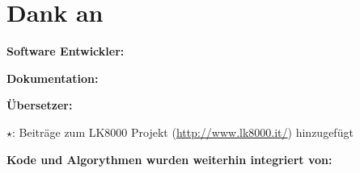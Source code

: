 \section{Dank an}\label{sec:credits}

{\large\bf Software Entwickler:}
\begin{compactitem}

\end{compactitem}

\vspace{1em}
{\large\bf Dokumentation:}
\begin{compactitem}

\end{compactitem}

\vspace{1em}
{\large\bf Übersetzer:}
\begin{compactitem}

\end{compactitem}

$\star$:  Beiträge zum  LK8000 Projekt (\url{http://www.lk8000.it/}) hinzugefügt

\vspace{1em}
{\large\bf Kode und Algorythmen wurden weiterhin integriert von:}
\begin{description}

\end{description}
